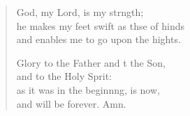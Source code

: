 \begin{verse}
\begin{patverse}
God, my Lord, is my strngth;\Flex\\
he makes my feet swift as thse of hinds\Med\\
and enables me to go upon the hights.

Glory to the Father and t the Son,\Med\\
and to the Holy Sp\pointup{\i}rit:\\
as it was in the beginn\pointup{\i}ng, is now,\Med\\
and will be forever. Amn. 
  \end{patverse}
\end{verse}
